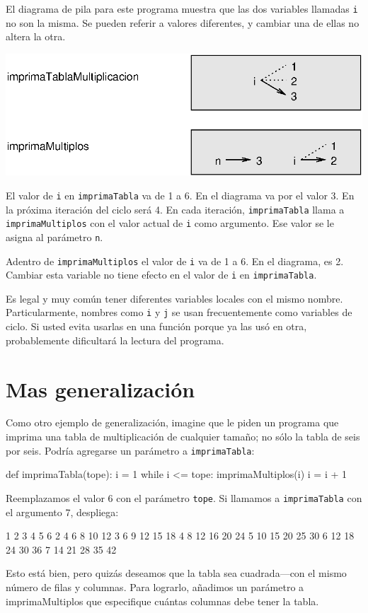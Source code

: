 El diagrama de pila para este programa muestra que las dos variables
llamadas \texttt{i} no son la misma. Se pueden referir a valores diferentes,
y cambiar una de ellas no altera la otra.

\beforefig \centerline{\includegraphics{illustrations/stack4}}
\afterfig

El valor de \texttt{i} en \texttt{imprimaTabla} va de 1 a 6. En el
diagrama va por el valor 3. En la próxima iteración del ciclo será
4. En cada iteración, \texttt{imprimaTabla} llama a \texttt{imprimaMultiplos}
con el valor actual de \texttt{i} como argumento. Ese valor se le
asigna al parámetro \texttt{n}.

Adentro de \texttt{imprimaMultiplos} el valor de \texttt{i} va de
1 a 6. En el diagrama, es 2. Cambiar esta variable no tiene efecto
en el valor de \texttt{i} en \texttt{imprimaTabla}.

Es legal y muy común tener diferentes variables locales con el mismo
nombre. Particularmente, nombres como \texttt{i} y \texttt{j} se usan
frecuentemente como variables de ciclo. Si usted evita usarlas en
una función porque ya las usó en otra, probablemente dificultará la
lectura del programa.


\section{Mas generalización}

Como otro ejemplo de generalización, imagine que le piden un programa
que imprima una tabla de multiplicación de cualquier tamaño; no sólo
la tabla de seis por seis. Podría agregarse un parámetro a \texttt{imprimaTabla}:
\begin{pythoncode}
def imprimaTabla(tope):
  i = 1
  while i <= tope:
    imprimaMultiplos(i)
    i = i + 1
\end{pythoncode}

Reemplazamos el valor 6 con el parámetro \texttt{tope}. Si llamamos
a \texttt{imprimaTabla} con el argumento 7, despliega:
\begin{pythoncode}
1      2      3      4      5      6
2      4      6      8      10     12
3      6      9      12     15     18
4      8      12     16     20     24
5      10     15     20     25     30
6      12     18     24     30     36
7      14     21     28     35     42
\end{pythoncode}
Esto está bien, pero quizás deseamos que la tabla sea cuadrada—con
el mismo número de filas y columnas. Para lograrlo, añadimos un parámetro
a imprimaMultiplos que especifique cuántas columnas debe tener la
tabla.

